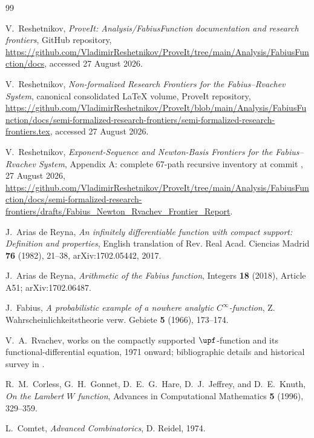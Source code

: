 \documentclass[11pt,oneside]{article}
\theoremstyle{definition}
\theoremstyle{remark}
\newcommand{\1}{\mathbf 1}
\begin{document}
\begin{thebibliography}{99}

V.~Reshetnikov,
\emph{ProveIt: Analysis/FabiusFunction documentation and research frontiers},
GitHub repository,
\url{https://github.com/VladimirReshetnikov/ProveIt/tree/main/Analysis/FabiusFunction/docs},
accessed 27 August 2026.

V.~Reshetnikov,
\emph{Non-formalized Research Frontiers for the Fabius--Rvachev System},
canonical consolidated LaTeX volume, ProveIt repository,
\url{https://github.com/VladimirReshetnikov/ProveIt/blob/main/Analysis/FabiusFunction/docs/semi-formalized-research-frontiers/semi-formalized-research-frontiers.tex},
accessed 27 August 2026.

V.~Reshetnikov,
\emph{Exponent-Sequence and Newton-Basis Frontiers for the Fabius--Rvachev System},
Appendix A: complete 67-path recursive inventory at commit
, 27 August 2026,
\url{https://github.com/VladimirReshetnikov/ProveIt/tree/main/Analysis/FabiusFunction/docs/semi-formalized-research-frontiers/drafts/Fabius_Newton_Rvachev_Frontier_Report}.

J.~Arias de Reyna,
\emph{An infinitely differentiable function with compact support: Definition and
properties},
English translation of Rev. Real Acad. Ciencias Madrid \textbf{76} (1982), 21--38,
arXiv:1702.05442, 2017.

J.~Arias de Reyna,
\emph{Arithmetic of the Fabius function},
Integers \textbf{18} (2018), Article A51; arXiv:1702.06487.

J.~Fabius,
\emph{A probabilistic example of a nowhere analytic \(C^\infty\)-function},
Z. Wahrscheinlichkeitstheorie verw. Gebiete \textbf{5} (1966), 173--174.

V.~A.~Rvachev,
works on the compactly supported \(\upf\)-function and its functional-differential
equation, 1971 onward; bibliographic details and historical survey in
\cite{p10:Arias1982,p10:AriasArithmetic}.

R.~M.~Corless, G.~H.~Gonnet, D.~E.~G.~Hare, D.~J.~Jeffrey, and D.~E.~Knuth,
\emph{On the Lambert \(W\) function},
Advances in Computational Mathematics \textbf{5} (1996), 329--359.

L.~Comtet,
\emph{Advanced Combinatorics},
D. Reidel, 1974.


\end{thebibliography}
\end{document}
